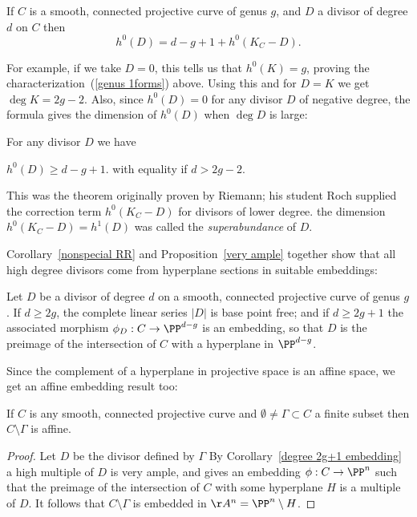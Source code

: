 \begin{theorem}\label{RR}
 If $C$ is a smooth, connected projective curve of genus $g$, and $D$ a divisor of degree $d$ on $C$ then
$$
h^0(D) = d - g + 1 + h^0(K_C - D).
$$
\end{theorem}

For example, if we take $D=0$, this tells us that $h^0(K) = g$, proving the characterization~(\ref{genus 1forms}) above. Using this and \trr for $D=K$
we get $\deg K = 2g-2$. Also, since $h^0(D) = 0$ for any divisor $D$ of negative degree, the formula gives the dimension of $h^{0}(D)$ when $\deg D$ is large:

\begin{corollary}\label{nonspecial RR}
For any divisor $D$ we have
 
$
h^0(D) \geq d - g + 1.
$
with equality if $d > 2g-2$.
\end{corollary}
This was the theorem originally proven by Riemann; his student Roch supplied the correction term $h^0(K_C - D)$ for divisors of lower degree.
the dimension $h^0(K_C-D) = h^1(D)$ was called the \emph{superabundance} of $D$.

Corollary~\ref{nonspecial RR} and Proposition~\ref{very ample} together show that all high degree divisors come from hyperplane sections in 
suitable embeddings:

\begin{corollary}\label{degree 2g+1 embedding}
Let $D$ be a divisor of degree $d$ on a smooth, connected projective curve of genus $g$. If $d \geq 2g$, the complete linear series $|D|$ is base point free; and if $d \geq 2g+1$ the associated morphism $\phi_D : C \to \PP^{d-g}$ is an embedding, so that
$D$ is the preimage of the intersection of $C$ with a hyperplane in $ \PP^{d-g}$.
\end{corollary}

Since the complement of a hyperplane in projective space is an affine space, we get an affine embedding result too:

\begin{corollary}
 If $C$ is any smooth, connected projective curve and $\emptyset \neq \Gamma \subset C$ a finite subset then $C \setminus \Gamma$ is affine.
\end{corollary}
\begin{proof}
Let $D$ be the divisor defined by $\Gamma$ By Corollary~\ref{degree 2g+1 embedding} a high multiple of $D$ is very ample,
and gives an embedding $\phi: C\to \PP^n$ such that the preimage of the intersection of $C$ with some hyperplane $H$
is a multiple of $D$. It follows that $C\setminus \Gamma$ is embedded in $\AA^n = \PP^n\setminus H$.
\end{proof}
 
